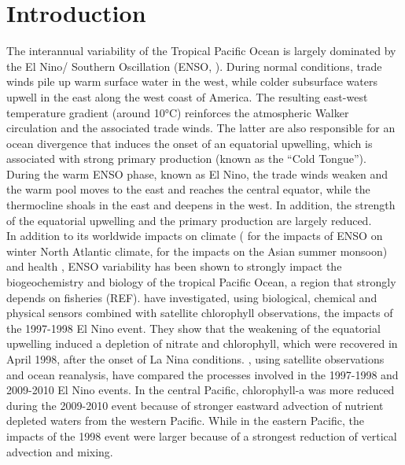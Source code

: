 \section{Introduction}

The interannual variability of the Tropical Pacific Ocean is largely dominated by the El Nino/ Southern Oscillation (ENSO, \citealt{trenberthNinoSouthernOscillation2019}). During normal conditions, trade winds pile up warm surface water in the west, while colder subsurface waters upwell in the east along the west coast of America. The resulting east-west temperature gradient (around 10°C) reinforces the atmospheric Walker circulation and the associated trade winds. The latter are also responsible for an ocean divergence that induces the onset of an equatorial upwelling, which is associated with strong primary production (known as the “Cold Tongue”). During the warm ENSO phase, known as El Nino, the trade winds weaken and the warm pool moves to the east and reaches the central equator, while the thermocline shoals in the east and deepens in the west. In addition, the strength of the equatorial upwelling and the primary production are largely reduced.\\

In addition to its worldwide impacts on climate (\citealt{toniazzoInfluenceENSOWinter2006} for the impacts of ENSO on winter North Atlantic climate, \citealt{juAsianSummerMonsoon1995} for the impacts on the Asian summer monsoon) and health \cite{kovatsNinoHealth2003}, ENSO variability has been shown to strongly impact the biogeochemistry and biology of the tropical Pacific Ocean, a region that strongly depends on fisheries (REF). \cite{chavezBiologicalChemicalResponse1999} have investigated, using biological, chemical and physical sensors combined with satellite chlorophyll observations, the impacts of the 1997-1998 El Nino event. They show that the weakening of the equatorial upwelling induced a depletion of nitrate and chlorophyll, which were recovered in April 1998, after the onset of La Nina conditions. \cite{gierachBiologicalResponse19972012}, using satellite observations and ocean reanalysis, have compared the processes involved in the 1997-1998 and 2009-2010 El Nino events. In the central Pacific, chlorophyll-a was more reduced during the 2009-2010 event because of stronger eastward advection of nutrient depleted waters from the western Pacific. While in the eastern Pacific, the impacts of the 1998 event were larger because of a strongest reduction of vertical advection and mixing.\\

